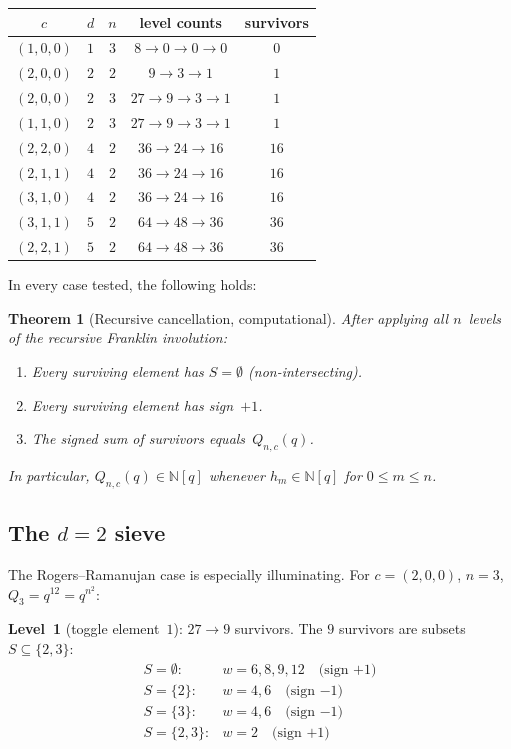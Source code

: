 \documentclass[11pt]{article}
\newcommand{\N}{\mathbb{N}}
\theoremstyle{plain}
\newtheorem{theorem}{Theorem}
\theoremstyle{definition}
\begin{document}
\medskip
\begin{center}
\begin{tabular}{c|c|c|c|c}
$c$ & $d$ & $n$ &
  \textbf{level counts} &
  \textbf{survivors} \\ \hline
$(1,0,0)$ & $1$ & $3$ &
  $8 \to 0 \to 0 \to 0$ & $0$ \\
$(2,0,0)$ & $2$ & $2$ &
  $9 \to 3 \to 1$ & $1$ \\
$(2,0,0)$ & $2$ & $3$ &
  $27 \to 9 \to 3 \to 1$ & $1$ \\
$(1,1,0)$ & $2$ & $3$ &
  $27 \to 9 \to 3 \to 1$ & $1$ \\
$(2,2,0)$ & $4$ & $2$ &
  $36 \to 24 \to 16$ & $16$ \\
$(2,1,1)$ & $4$ & $2$ &
  $36 \to 24 \to 16$ & $16$ \\
$(3,1,0)$ & $4$ & $2$ &
  $36 \to 24 \to 16$ & $16$ \\
$(3,1,1)$ & $5$ & $2$ &
  $64 \to 48 \to 36$ & $36$ \\
$(2,2,1)$ & $5$ & $2$ &
  $64 \to 48 \to 36$ & $36$ \\
\end{tabular}
\end{center}

\medskip\noindent
In every case tested, the following holds:

\begin{theorem}[Recursive cancellation, computational]
\label{thm:recursive-comp}
After applying all $n$~levels of the recursive Franklin
involution:
\begin{enumerate}
  \item Every surviving element has $S = \emptyset$
    \textup{(}non-intersecting\textup{)}.
  \item Every surviving element has sign~$+1$.
  \item The signed sum of survivors equals~$Q_{n,c}(q)$.
\end{enumerate}
In particular, $Q_{n,c}(q) \in \N[q]$ whenever $h_m \in
\N[q]$ for $0 \leq m \leq n$.
\end{theorem}


\subsection{The $d = 2$ sieve}

The Rogers--Ramanujan case is especially illuminating.
For $c = (2,0,0)$, $n = 3$, $Q_3 = q^{12} = q^{n^2}$:

\smallskip
\noindent\textbf{Level~1} (toggle element~$1$):
$27 \to 9$ survivors.  The $9$ survivors are subsets
$S \subseteq \{2, 3\}$:
\[
  \begin{array}{ll}
    S = \emptyset: & w = 6, 8, 9, 12 \quad\text{(sign $+1$)} \\
    S = \{2\}: & w = 4, 6 \quad\text{(sign $-1$)} \\
    S = \{3\}: & w = 4, 6 \quad\text{(sign $-1$)} \\
    S = \{2,3\}: & w = 2 \quad\text{(sign $+1$)}
  \end{array}
\]
\end{document}
